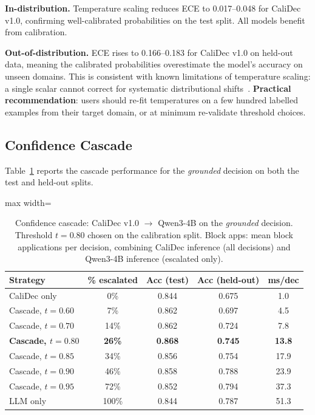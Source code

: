 \documentclass[twocolumn]{ICCKjournal}
\begin{document}
\textbf{In-distribution.} Temperature scaling reduces ECE to 0.017--0.048 for CaliDec v1.0, confirming well-calibrated probabilities on the test split. All models benefit from calibration.

\textbf{Out-of-distribution.} ECE rises to 0.166--0.183 for CaliDec v1.0 on held-out data, meaning the calibrated probabilities overestimate the model's accuracy on unseen domains. This is consistent with known limitations of temperature scaling: a single scalar cannot correct for systematic distributional shifts~\cite{guo2017calibration}. \textbf{Practical recommendation}: users should re-fit temperatures on a few hundred labelled examples from their target domain, or at minimum re-validate threshold choices.

\subsection{Confidence Cascade}
\label{sec:cascaderesults}
Table~\ref{tab:cascade} reports the cascade performance for the \emph{grounded} decision on both the test and held-out splits.

\begin{table}[H]
\caption{Confidence cascade: CaliDec v1.0 $\to$ Qwen3-4B on the \emph{grounded} decision. Threshold $t=0.80$ chosen on the calibration split. Block apps: mean block applications per decision, combining CaliDec inference (all decisions) and Qwen3-4B inference (escalated only).}
\label{tab:cascade}
\centering
\small
\begin{adjustbox}{max width=\linewidth}
\begin{tabular}{lcccc}
\toprule
\textbf{Strategy} & \textbf{\% escalated} & \textbf{Acc (test)} & \textbf{Acc (held-out)} & \textbf{ms/dec} \\
\midrule
CaliDec only        & 0\%   & 0.844 & 0.675 & 1.0  \\
Cascade, $t=0.60$   & 7\%   & 0.862 & 0.697 & 4.5  \\
Cascade, $t=0.70$   & 14\%  & 0.862 & 0.724 & 7.8  \\
\textbf{Cascade, $t=0.80$} & \textbf{26\%} & \textbf{0.868} & \textbf{0.745} & \textbf{13.8} \\
Cascade, $t=0.85$   & 34\%  & 0.856 & 0.754 & 17.9 \\
Cascade, $t=0.90$   & 46\%  & 0.858 & 0.788 & 23.9 \\
Cascade, $t=0.95$   & 72\%  & 0.852 & 0.794 & 37.3 \\
LLM only            & 100\% & 0.844 & 0.787 & 51.3 \\
\bottomrule
\end{tabular}
\end{adjustbox}
\end{table}
\end{document}
